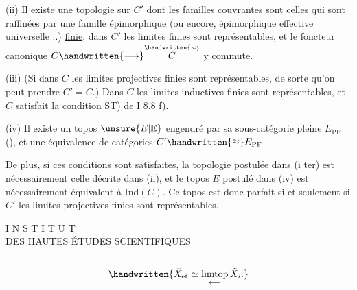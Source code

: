 (ii)  Il existe une topologie sur $C'$ dont les familles couvrantes sont celles qui sont raffinées par une famille épimorphique (ou encore, épimorphique effective universelle ..) \uline{finie}, dans $C'$ les limites  finies sont représentables, et le foncteur canonique $C\handwritten{\longrightarrow}\overset{\handwritten{\scriptscriptstyle\sim}}{C}$  y commute.

(iii) (Si dans $C$ les limites projectives finies sont représentables, de sorte qu'on peut prendre $C'=C$.) Dans $C$ les limites inductives finies sont représentables, et $C$ satisfait la condition ST) de I 8.8 f).
\margin{\handwritten{$\times$}}

(iv) Il existe un topos $\unsure{E|\mathbb{E}}$ engendré par sa sous-catégorie pleine $E_{\mathrm{PF}}$ (\quad\quad), et une équivalence de catégories $C'\handwritten{\approxeq}E_{\mathrm{PF}}$.
\margin{\handwritten{$\times$}}

De plus,  si ces conditions sont satisfaites, la topologie postulée dans (i ter) est nécessairement celle décrite dans (ii), et le topos $E$ postulé dans (iv) est nécessairement équivalent à $\mathrm{Ind}(C)$. Ce topos est donc parfait si et seulement si  $C'$  les limites projectives finies sont représentables.
\begin{center}
I N S T I T U T\\
DES HAUTES ÉTUDES SCIENTIFIQUES\\
\rule{1cm}{0.4pt}
\end{center}




\[
\handwritten{\tilde{X}_{\mathrm{et}}\simeq\underset{\longleftarrow}{\mathrm{limtop}}\,\tilde{X}_i.}
\]

